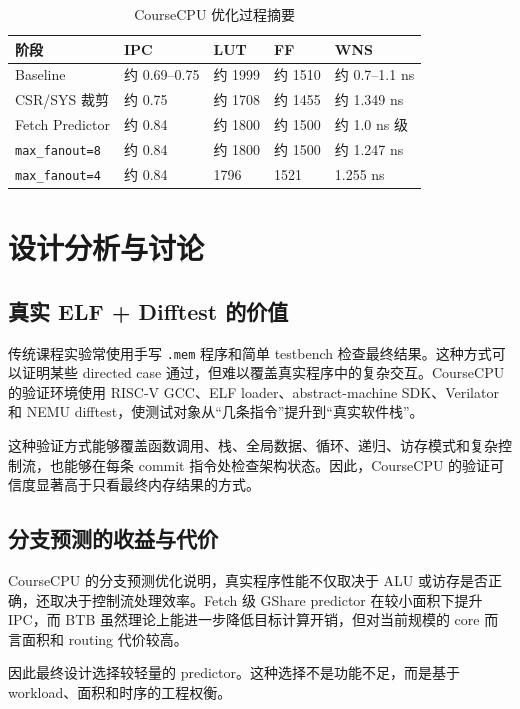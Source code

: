 \documentclass[UTF8,a4paper,12pt]{ctexrep}
\begin{document}
\begin{table}[htbp]
  \centering
  \caption{CourseCPU 优化过程摘要}
  \begin{tabularx}{\textwidth}{lXXXX}
    \toprule
    阶段 & IPC & LUT & FF & WNS \\
    \midrule
    Baseline & 约 0.69--0.75 & 约 1999 & 约 1510 & 约 0.7--1.1 ns \\
    CSR/SYS 裁剪 & 约 0.75 & 约 1708 & 约 1455 & 约 1.349 ns \\
    Fetch Predictor & 约 0.84 & 约 1800 & 约 1500 & 约 1.0 ns 级 \\
    \texttt{max\_fanout=8} & 约 0.84 & 约 1800 & 约 1500 & 约 1.247 ns \\
    \texttt{max\_fanout=4} & 约 0.84 & 1796 & 1521 & 1.255 ns \\
    \bottomrule
  \end{tabularx}
\end{table}

\chapter{设计分析与讨论}

\section{真实 ELF + Difftest 的价值}

传统课程实验常使用手写 \texttt{.mem} 程序和简单 testbench 检查最终结果。这种方式可以证明某些 directed case 通过，但难以覆盖真实程序中的复杂交互。CourseCPU 的验证环境使用 RISC-V GCC、ELF loader、abstract-machine SDK、Verilator 和 NEMU difftest，使测试对象从“几条指令”提升到“真实软件栈”。

这种验证方式能够覆盖函数调用、栈、全局数据、循环、递归、访存模式和复杂控制流，也能够在每条 commit 指令处检查架构状态。因此，CourseCPU 的验证可信度显著高于只看最终内存结果的方式。

\section{分支预测的收益与代价}

CourseCPU 的分支预测优化说明，真实程序性能不仅取决于 ALU 或访存是否正确，还取决于控制流处理效率。Fetch 级 GShare predictor 在较小面积下提升 IPC，而 BTB 虽然理论上能进一步降低目标计算开销，但对当前规模的 core 而言面积和 routing 代价较高。

因此最终设计选择较轻量的 predictor。这种选择不是功能不足，而是基于 workload、面积和时序的工程权衡。
\end{document}
